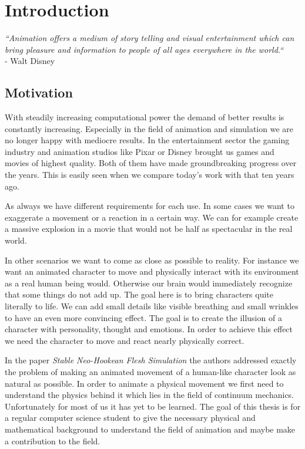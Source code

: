 \chapter{Introduction}
\textit{``Animation offers a medium of story telling and visual entertainment which can bring pleasure and information to people of all ages everywhere in the world.``} \\
- Walt Disney


\section{Motivation}
With steadily increasing computational power the demand of better results is constantly increasing. Especially in the field of animation and simulation we are no longer happy with mediocre results. 
In the entertainment sector the gaming industry and animation studios like Pixar\textsuperscript{\textcopyright} or Disney\textsuperscript{\textcopyright} brought us games and movies of highest quality. Both of them have made groundbreaking progress over the years. This is easily seen when we compare today's work with that ten years ago. 

As always we have different requirements for each use.
In some cases we want to exaggerate a movement or a reaction in a certain way. We can for example create a massive explosion in a movie that would not be half as spectacular in the real world. 

In other scenarios we want to come as close as possible to reality. For instance we want an animated character to move and physically interact with its environment as a real human being would. Otherwise our brain would immediately recognize that some things do not add up.
The goal here is to bring characters quite literally to life. We can add small details like visible breathing and small wrinkles to have an even more convincing effect. The goal is to create the illusion of a character with personality, thought and emotions. In order to achieve this effect we need the character to move and react nearly physically correct. 

In the paper \textit{Stable Neo-Hookean Flesh Simulation} \cite{Smith:2018:SNF:3191713.3180491} the authors addressed exactly the problem of making an animated movement of a human-like character look as natural as possible. In order to animate a physical movement we first need to understand the physics behind it which lies in the field of continuum mechanics. Unfortunately for most of us it has yet to be learned. The goal of this thesis is for a regular computer science student to give the necessary physical and mathematical background to understand the field of animation and maybe make a contribution to the field.


